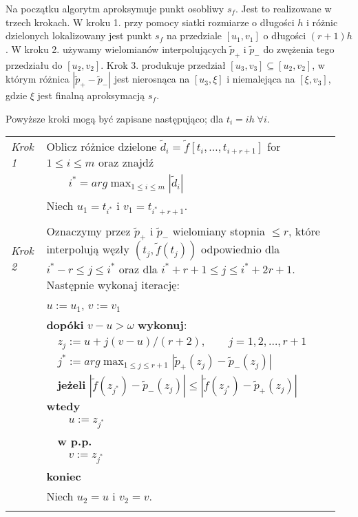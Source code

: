 \documentclass[oik, pdftex, robocza, man]{mgrwms}
\begin{document}
    Na początku algorytm aproksymuje punkt osobliwy $s_f$. Jest to realizowane w trzech krokach. W kroku 1. przy pomocy siatki rozmiarze o długości $h$ i różnic dzielonych lokalizowany jest punkt $s_f$ na przedziale $[u_1, v_1]$ o długości $(r + 1)h$. W kroku 2. używamy wielomianów interpolujących $\tilde{p}_+$ i $\tilde{p}_-$ do zwężenia tego przedziału do $[u_2, v_2]$. Krok 3. produkuje przedział $[u_3, v_3] \subseteq [u_2, v_2]$, w którym różnica $|\tilde{p}_{+} - \tilde{p}_{-}|$ jest nierosnąca na $[u_3, \xi]$ i niemalejąca na $[\xi, v_3]$, gdzie $\xi$ jest finalną aproksymacją $s_f$.

    Powyższe kroki mogą być zapisane następująco; dla $t_i = ih \; \forall i$. \vspace{10pt}

    \noindent
    \begin{tabular}{p{0.10\linewidth} p{0.85\linewidth}}
        
        \textit{Krok 1} & Oblicz różnice dzielone $\tilde{d}_i = \tilde{f}[t_i, \ldots, t_{i+r+1}]$ for $1 \leq i \leq m $ oraz znajdź \\
                        & \(\displaystyle \qquad i^* = arg \max_{1 \leq i \leq m }|\tilde{d}_i| \)  \\
                        & Niech $u_1 = t_{i^*}$ i $v_1 = t_{i^* + r + 1}$. \\
                        & \\

        \textit{Krok 2} & Oznaczymy przez $\tilde{p}_+$ i $\tilde{p}_-$ wielomiany stopnia $ \leq r$, które interpolują węzły $(t_j, \tilde{f}(t_j))$ odpowiednio dla $i^* - r \leq j \leq i^*$ oraz dla $i^* + r + 1 \leq j \leq i^* + 2r + 1$. Następnie wykonaj iterację: \\
                        & $u := u_1$, $v := v_1$ \\
                        & \textbf{dopóki} $v-u > \omega$ \textbf{wykonuj}: \\
                        & $\quad$$z_j := u + j(v-u) / (r+2), \qquad j = 1, 2, \ldots, r + 1$ \\
                        & $\quad$\(\displaystyle j^* := arg \max_{1 \leq j \leq r + 1}|\tilde{p}_{+}(z_j) - \tilde{p}_{-}(z_j)| \) \\
                        & $\quad$\textbf{jeżeli} $|\tilde{f}(z_{j^*}) - \tilde{p}_{-}(z_j)| \leq |\tilde{f}(z_{j^*}) - \tilde{p}_{+}(z_j)|$ \textbf{wtedy} \\
                        & $\quad\quad$$u:= z_{j^*}$ \\
                        & $\quad$\textbf{w p.p.} \\
                        & $\quad\quad$$v:= z_{j^*}$ \\
                        & \textbf{koniec} \\
                        & Niech $u_2 = u$ i $v_2 = v$. \\
                        & \\


\end{tabular}
\end{document}
